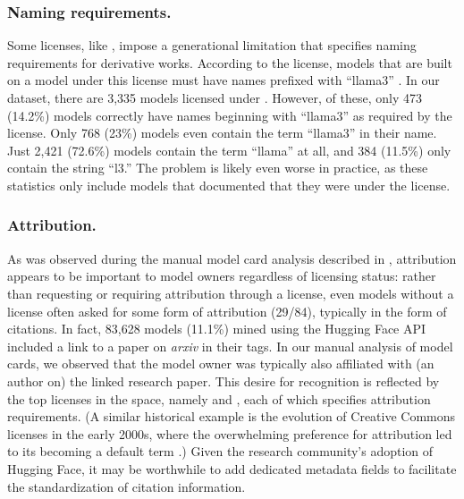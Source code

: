 \subsubsection{Naming requirements.} 
\label{sec:naming_requirements}
Some licenses, like , impose a %
generational limitation \cite{oss_book} that specifies naming requirements for derivative works.  According to the license, models that are built on a model under this license must have names prefixed with ``llama3'' \cite{llama3_license}.  In our dataset, there are 3,335 models licensed under . However, of these, only 473 (14.2\%) models correctly have names beginning with ``llama3'' as required by the license.  Only 768 (23\%) models even contain the term ``llama3'' in their name.  Just 2,421 (72.6\%) models contain the term ``llama'' at all, and 384 (11.5\%) only contain the string ``l3.'' %
The problem is likely even worse in practice, as these statistics only include models that documented that they were under the  license.  %

\subsubsection{Attribution.}
As was observed during the manual model card analysis described in , attribution appears to be important to model owners regardless of licensing status: rather than requesting or requiring attribution through a license, even models without a license often asked for some form of attribution (29/84), typically in the form of citations. %
In fact, 83,628 models (11.1\%) mined using the Hugging Face API included a link to a paper on \textit{arxiv} \cite{arxiv} in their tags.  In our manual analysis of model cards, we observed that the model owner was typically also affiliated with (\eg an author on) the linked research paper. %
This desire for recognition is reflected by the top licenses in the space, namely  and , each of which specifies attribution requirements. (A similar historical example is the evolution of Creative Commons licenses in the early 2000s, where the overwhelming preference for attribution led to its becoming a default term \cite{standard_attribution}.) Given the research community's adoption of Hugging Face, %
it may be worthwhile to add dedicated metadata fields to facilitate the standardization of citation information. 
